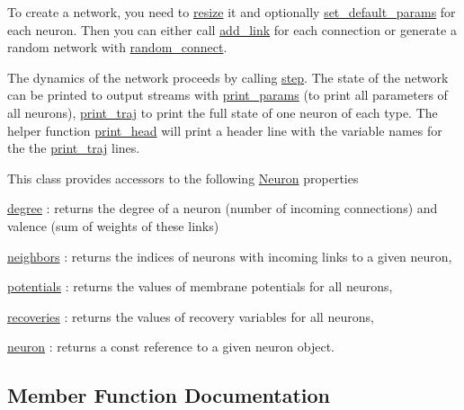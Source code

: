 To create a network, you need to \hyperlink{classNetwork_ad91ae24f308dd2b46ff76396fcdb9765}{resize} it and optionally \hyperlink{classNetwork_ad1d20020028425cfab199da1942172c9}{set\+\_\+default\+\_\+params} for each neuron. Then you can either call \hyperlink{classNetwork_a6ebe0899329973e4924997a25e205856}{add\+\_\+link} for each connection or generate a random network with \hyperlink{classNetwork_a681d8f731ce258376a20f9bf062b943b}{random\+\_\+connect}.

The dynamics of the network proceeds by calling \hyperlink{classNetwork_a53665a3a69e6ec894c313d0ce3fb7f34}{step}. The state of the network can be printed to output streams with \hyperlink{classNetwork_afc43116eb2429aeec0f3c6a54d252142}{print\+\_\+params} (to print all parameters of all neurons), \hyperlink{classNetwork_ae460d31557bba058fdf66e4fe5feb801}{print\+\_\+traj} to print the full state of one neuron of each type. The helper function \hyperlink{classNetwork_ab572dd33cb91d9f0aae89c4477809d26}{print\+\_\+head} will print a header line with the variable names for the the \hyperlink{classNetwork_ae460d31557bba058fdf66e4fe5feb801}{print\+\_\+traj} lines.

This class provides accessors to the following \hyperlink{classNeuron}{Neuron} properties
\begin{DoxyItemize}
\item \hyperlink{classNetwork_a313da14a6a430ae14e3943dba78edb61}{degree} \+: returns the degree of a neuron (number of incoming connections) and valence (sum of weights of these links)
\item \hyperlink{classNetwork_a98bbf44b077ba1bec5a62ecffc405503}{neighbors} \+: returns the indices of neurons with incoming links to a given neuron,
\item \hyperlink{classNetwork_a44d9c341bfec26cb37efe3c29fd7a103}{potentials} \+: returns the values of membrane potentials for all neurons,
\item \hyperlink{classNetwork_a2e9dbb815c622cccdd50186ae8c9f4a7}{recoveries} \+: returns the values of recovery variables for all neurons,
\item \hyperlink{classNetwork_a4639c4fd24bc6dc807ae35af6577ed7f}{neuron} \+: returns a const reference to a given neuron object. 
\end{DoxyItemize}

\subsection{Member Function Documentation}
\mbox{\label{classNetwork_a6ebe0899329973e4924997a25e205856}} 
